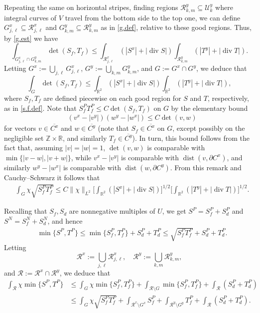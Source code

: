 \documentclass[11pt,a4paper]{amsart}
\newcommand{\Z}{\mathbb{Z}}
\newcommand{\R}{\mathbb{R}}
\newcommand{\de}{\partial}
\renewcommand{\bar}{\overline}
\theoremstyle{definition}
\DeclareMathOperator{\dive}{div}
\newcommand{\str}{\mathcal{U}}
\begin{document}
Repeating the same on horizontal stripes, finding regions
$\mathcal{R}_{k,m}^y\subseteq\str_k^y$ where integral curves of $V$ travel from the bottom side to the top one, we can define $G_{j,\ell}^x\subseteq\mathcal{R}_{j,\ell}^x$ and $G_{k,m}^y\subseteq\mathcal{R}_{k,m}^y$ as in \cref{g.def},
relative to these good regions.
Thus, by \cref{g.est} we have
$$\int_{G_{j,\ell}^x\cap G_{k,m}^y}\det(S_f,T_f)\le\int_{\mathcal{R}_{j,\ell}^x}(|S^x|+\lvert \dive S\rvert)\int_{\mathcal{R}_{k,m}^y}(|T^y|+\lvert \dive T\rvert).$$
Letting $G^x:=\bigcup_{j,\ell}G_{j,\ell}^x$, $G^y:=\bigcup_{k,m}G_{k,m}^y$, and $G:=G^x\cap G^y$, we deduce that
$$\int_G\det(S_f,T_f)\le\int_{\R^2}(|S^x|+\lvert \dive S\rvert)\int_{\R^2}(|T^y|+\lvert \dive T\rvert),$$
where $S_f,T_f$ are defined piecewise on each good region for $S$ and $T$, respectively,
as in \cref{s.f.def}. Note that $S_f^P T_f^P\le C\det(S_f,T_f)$ on $G$ by the elementary bound
\begin{align*}
	&(v^x-|v^y|)(w^y-|w^x|)
	\le C\det(v,w)
\end{align*}
for vectors $v\in\bar{C^x}$ and $w\in\bar{C^y}$ (note that $S_f\in\bar{C^x}$ on $G$, except possibly on the negligible set $\Z\times\R$, and similarly $T_f\in\bar{C^y}$). In turn, this bound follows from the fact that, assuming $|v|=|w|=1$, $\det(v,w)$ is comparable with $\min\{|v-w|,|v+w|\}$, while $v^x-|v^y|$ is comparable with $\operatorname{dist}(v,\de C^x)$, and similarly $w^y-|w^x|$ is comparable with $\operatorname{dist}(w,\de C^y)$.
From this remark and Cauchy--Schwarz it follows that
\begin{align*}
	&\int_{G}\chi\sqrt{S_f^P T_f^P}
	\le C\|\chi\|_{L^2}\Big[\int_{\R^2}(|S^x|+\lvert \dive S\rvert)\Big]^{1/2}\Big[\int_{\R^2}(|T^y|+\lvert \dive T\rvert)\Big]^{1/2}.
\end{align*}

Recalling that $S_f,S_d$ are nonnegative multiples of $U$, we get $S^P=S_f^P+S_d^P$ and $S^N=S_f^N+S_d^N$, and hence
\begin{align*}
	&\min\{S^P,T^P\}
	\le\min\{S_f^P,T_f^P\}+S_d^P+T_d^P
	\le\sqrt{S_f^P T_f^P}+S_d^P+T_d^P.
\end{align*}
Letting
$$\mathcal{R}^x:=\bigcup_{j,\ell}\mathcal{R}_{j,\ell}^x,\quad \mathcal{R}^y:=\bigcup_{k,m}\mathcal{R}_{k,m}^y,$$
and $\mathcal{R}:=\mathcal{R}^x\cap\mathcal{R}^y$,
we deduce that
\begin{align*}
	\int_{\mathcal{R}} \chi\min\{S^P,T^P\}
	&\le\int_{G}\chi\min\{S_f^P,T_f^P\}
	+\int_{\mathcal{R}\setminus G}\min\{S_f^P,T_f^P\}
	+\int_{\mathcal{R}}(S_d^P+T_d^P) \\
	&\le\int_{G}\chi\sqrt{S_f^P T_f^P}
	+\int_{\mathcal{R}^x\setminus G^x}S_f^P
	+\int_{\mathcal{R}^y\setminus G^y}T_f^P
	+\int_{\mathcal{R}}(S_d^P+T_d^P).
\end{align*}
\end{document}
